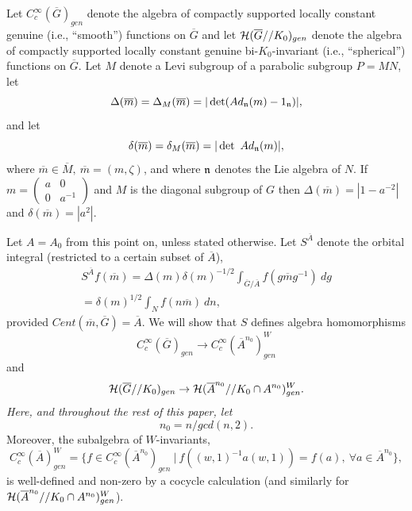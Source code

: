 \documentclass[twocolumn,10pt]{article}
\begin{document}
Let
$C_c^\infty(\overline{G})_{gen}$
denote the algebra of compactly supported
locally constant genuine 
(i.e., ``smooth'')
functions on $\overline{G}$ and let
${\cal H}(\overline{G}//K_0)_{gen}$
denote the algebra of compactly supported
locally constant genuine bi-$K_0$-invariant
(i.e., ``spherical'')
functions on $\overline{G}$.
Let $M$ denote a Levi subgroup of a parabolic
subgroup $P=MN$, let
\[
\Delta(\overline{m})=\Delta_M(\overline{m})
=|\det(Ad_{\frak{n}}(m)-1_{\frak{n}})|,
\]
and let
\[
\delta(\overline{m})=\delta_M(\overline{m})
=|\det\ Ad_{\frak{n}}(m)|,
\]
where $\overline{m}\in \overline{M},\ 
\overline{m}=(m,\zeta)$, and where
$\frak{n}$ denotes the Lie algebra of $N$.
If 
$m=\left( \begin{array}{cc}
a & 0 \\
0 & a^{-1} \end{array}
\right)$ and $M$ is the diagonal subgroup of $G$ then
$\Delta(\overline{m})=|1-a^{-2}|$ and
$\delta(\overline{m})=|a^2|$.

Let $A=A_0$ from this point on, unless stated otherwise.
Let $S^{\overline{A}}$ denote the orbital integral
(restricted to a certain subset of 
$\overline{A}$),
\[
\begin{array}{c}
S^{\overline{A}}f(\overline{m})=\Delta(m)\delta(m)^{-1/2}
\int_{\overline{G}/\overline{A}}
f(g\overline{m}g^{-1})\ dg \\
=\delta(m)^{1/2}\int_{N}f(n\overline{m})\ dn,
\end{array}
\]
provided $Cent(\overline{m},\overline{G})=\overline{A}$.
We will show that $S$ defines algebra homomorphisms
\[
C_c^\infty(\overline{G})_{gen}
\rightarrow 
C_c^\infty(\overline{A}^{n_0})^W_{gen}
\]
and 
\[
{\cal H}(\overline{G}//K_0)_{gen}
\rightarrow 
{\cal H}(\overline{A}^{n_0}//K_0\cap A^{n_0})^W_{gen}.
\]
{\it Here, and throughout the rest of this paper, let}
\[
n_0=n/gcd(n,2).
\]
Moreover, the subalgebra of $W$-invariants,
\[
C_c^\infty(\overline{A})^W_{gen}
=\{f\in C_c^\infty(\overline{A}^{n_0})_{gen} \ |\ 
f((w,1)^{-1}a(w,1))=f(a),\ \forall a\in 
\overline{A}^{n_0} \},
\]
is well-defined and non-zero by a cocycle calculation
(and similarly for
${\cal H}(\overline{A}^{n_0}//K_0\cap A^{n_0})^W_{gen}$).
\end{document}
